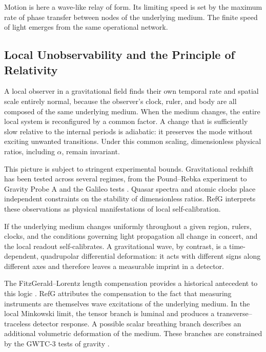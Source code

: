 \documentclass[11pt,a4paper]{article}
\begin{document}
Motion is here a wave-like relay of form. Its limiting speed is set by the maximum rate of phase transfer between nodes of the underlying medium. The finite speed of light emerges from the same operational network.

\subsection{Local Unobservability and the Principle of Relativity}

A local observer in a gravitational field finds their own temporal rate and spatial scale entirely normal, because the observer's clock, ruler, and body are all composed of the same underlying medium. When the medium changes, the entire local system is reconfigured by a common factor. A change that is sufficiently slow relative to the internal periods is adiabatic: it preserves the mode without exciting unwanted transitions. Under this common scaling, dimensionless physical ratios, including $\alpha$, remain invariant.

This picture is subject to stringent experimental bounds. Gravitational redshift has been tested across several regimes, from the Pound--Rebka experiment to Gravity Probe A and the Galileo tests \citep{pound1960,vessot1980,delva2018,herrmann2018}. Quasar spectra and atomic clocks place independent constraints on the stability of dimensionless ratios. RefG interprets these observations as physical manifestations of local self-calibration.

If the underlying medium changes uniformly throughout a given region, rulers, clocks, and the conditions governing light propagation all change in concert, and the local readout self-calibrates. A gravitational wave, by contrast, is a time-dependent, quadrupolar differential deformation: it acts with different signs along different axes and therefore leaves a measurable imprint in a detector.

The FitzGerald--Lorentz length compensation provides a historical antecedent to this logic \citep{fitzgerald1889,lorentz1892}. RefG attributes the compensation to the fact that measuring instruments are themselves wave excitations of the underlying medium. In the local Minkowski limit, the tensor branch is luminal and produces a transverse--traceless detector response. A possible scalar breathing branch describes an additional volumetric deformation of the medium. These branches are constrained by the GWTC-3 tests of gravity \citep{ligovirgokagra2022}.
\end{document}
